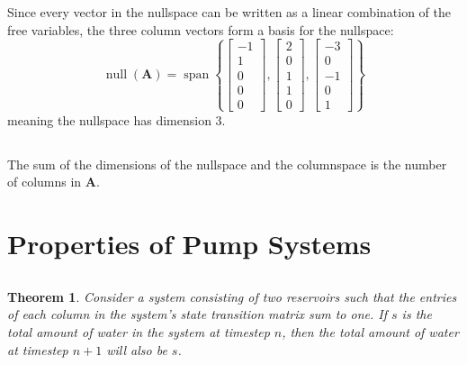 \documentclass[]{article}
\newtheorem{genthm}{Theorem}
\numberwithin{equation}{section}
\begin{document}
Since every vector in the nullspace can be written as a linear combination of the free variables, the three column vectors form a basis for the nullspace: 
\begin{equation}
	\operatorname{null}(\mathbf{A}) = \operatorname{span}\left\lbrace
	\begin{bmatrix}
	-1 \\
	1 \\
	0 \\
	0 \\
	0
	\end{bmatrix},
	\begin{bmatrix}
	2 \\
	0 \\
	1 \\
	1 \\
	0
	\end{bmatrix},
	\begin{bmatrix}
	-3 \\
	0 \\
	-1 \\
	0 \\
	1
	\end{bmatrix}
	\right\rbrace
\end{equation}
meaning the nullspace has dimension 3. 

\subsection{}

The sum of the dimensions of the nullspace and the columnspace is the number of columns in \(\mathbf{A}\). 


\section{Properties of Pump Systems}

\subsection{}

\begin{genthm}
	Consider a system consisting of two reservoirs such that the entries of each column in the system’s state transition matrix sum to one. If \(s\) is the total amount of water in the system at timestep \(n\), then the total amount of water at timestep \(n + 1\) will also be \(s\).
\end{genthm}
\end{document}
